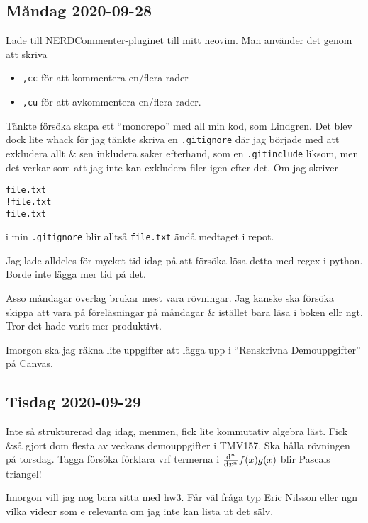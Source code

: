 \subsection{Måndag 2020-09-28}

Lade till NERDCommenter-pluginet till mitt neovim. Man använder det genom att skriva
\begin{itemize}
	\item \verb|,cc| för att kommentera en/flera rader
	\item \verb|,cu| för att avkommentera en/flera rader.
\end{itemize}

Tänkte försöka skapa ett \enquote{monorepo} med all min kod, som Lindgren. Det blev dock lite whack för jag tänkte skriva en \verb|.gitignore| där jag började med att exkludera allt \& sen inkludera saker efterhand, som en \verb|.gitinclude| liksom, men det verkar som att jag inte kan exkludera filer igen efter det. Om jag skriver\\
\begin{verbatim}
file.txt
!file.txt
file.txt
\end{verbatim}
i min \verb|.gitignore| blir alltså \verb|file.txt| ändå medtaget i repot.

Jag lade alldeles för mycket tid idag på att försöka lösa detta med regex i python. Borde inte lägga mer tid på det.

Asso måndagar överlag brukar mest vara rövningar. Jag kanske ska försöka skippa att vara på föreläsningar på måndagar \& istället bara läsa i boken ellr ngt. Tror det hade varit mer produktivt.

Imorgon ska jag räkna lite uppgifter att lägga upp i \enquote{Renskrivna Demouppgifter} på Canvas. \checkmark


\subsection{Tisdag 2020-09-29}

Inte så strukturerad dag idag, menmen, fick lite kommutativ algebra läst. Fick \&så gjort dom flesta av veckans demouppgifter i TMV157. Ska hålla rövningen på torsdag. Tagga försöka förklara vrf termerna i $\derivative[n]{}{x}f(x) g(x)$ blir Pascals triangel!

Imorgon vill jag nog bara sitta med hw3. Får väl fråga typ Eric Nilsson eller ngn vilka videor som e relevanta om jag inte kan lista ut det sälv.

